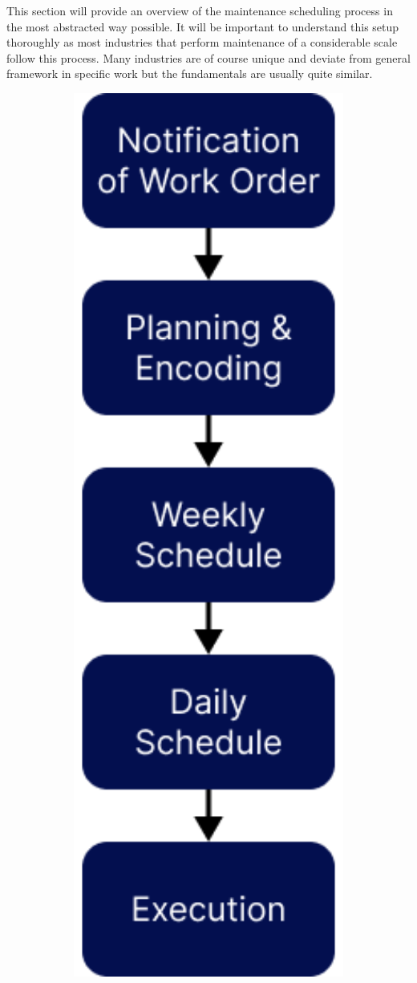 This section will provide an overview of the maintenance scheduling process in the most abstracted way possible. It will be important to understand this setup
thoroughly as most industries that perform maintenance of a considerable scale follow this process. Many industries are of course unique and deviate
from general framework in specific work but the fundamentals are usually quite similar. 

\begin{figure}
\includegraphics[width=1.0\textwidth]{../figures/top-level-schedule-overview.png}
\label{top-level-schedule-overview.png}
\end{figure}


